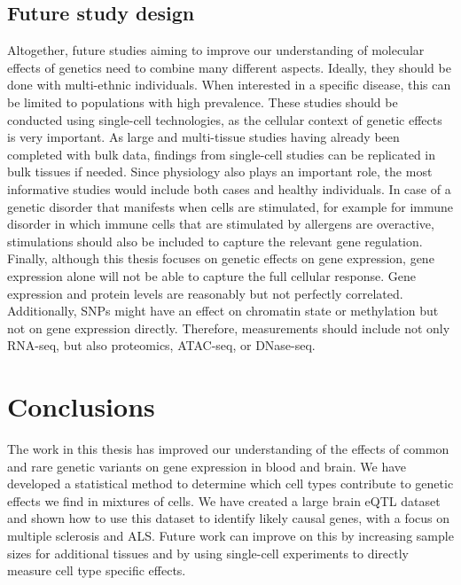 \subsection{Future study design}
Altogether, future studies aiming to improve our understanding of molecular effects of genetics need to combine many different aspects. Ideally, they should be done with multi-ethnic individuals. When interested in a specific disease, this can be limited to populations with high prevalence. These studies should be conducted using single-cell technologies, as the cellular context of genetic effects is very important. As large\cite{vosaUnravelingPolygenicArchitecture2018} and multi-tissue\cite{thegtexconsortiumGTExConsortiumAtlas2020} studies having already been completed with bulk data, findings from single-cell studies can be replicated in bulk tissues if needed. Since physiology also plays an important role, the most informative studies would include both cases and healthy individuals. In case of a genetic disorder that manifests when cells are stimulated, for example for immune disorder in which immune cells that are stimulated by allergens are overactive, stimulations should also be included to capture the relevant gene regulation. Finally, although this thesis focuses on genetic effects on gene expression, gene expression alone will not be able to capture the full cellular response. Gene expression and protein levels are reasonably but not perfectly correlated\cite{buccitelliMRNAsProteinsEmerging2020}. Additionally, SNPs might have an effect on chromatin state or methylation but not on gene expression directly. Therefore, measurements should include not only RNA-seq, but also proteomics, ATAC-seq, or DNase-seq. 

\section{Conclusions}
The work in this thesis has improved our understanding of the effects of common and rare genetic variants on gene expression in blood and brain. We have developed a statistical method to determine which cell types contribute to genetic effects we find in mixtures of cells. We have created a large brain eQTL dataset and shown how to use this dataset to identify likely causal genes, with a focus on multiple sclerosis and ALS. Future work can improve on this by increasing sample sizes for additional tissues and by using single-cell experiments to directly measure cell type specific effects. 





